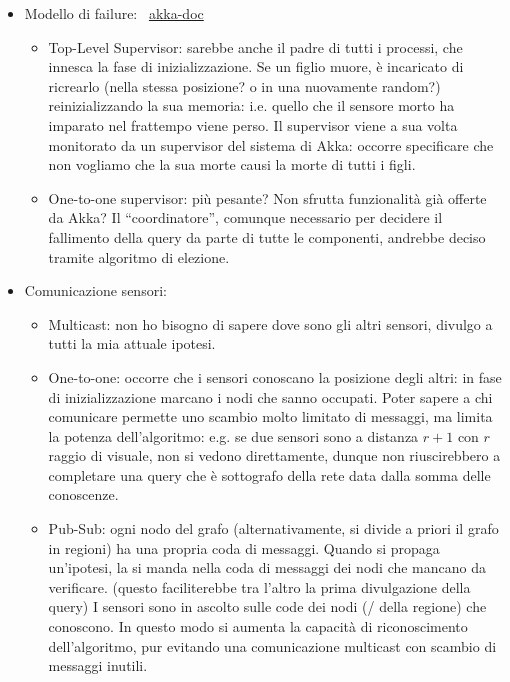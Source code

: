 \documentclass{article}
\begin{document}
\begin{itemize}
\begin{itemize}
  \end{itemize}
\item Modello di failure:%
  ~\href{https://doc.akka.io/docs/akka/2.5/fault-tolerance.html}{akka-doc}
  \begin{itemize}
  \item Top-Level Supervisor: sarebbe anche il padre di tutti
    i processi, che innesca la fase di inizializzazione. Se un figlio
    muore, \`e incaricato di ricrearlo (nella stessa posizione? o in una
    nuovamente random?) reinizializzando la sua memoria: i.e. quello che
    il sensore morto ha imparato nel frattempo viene perso.
    Il supervisor viene a sua volta monitorato da un supervisor del
    sistema di Akka: occorre specificare che non vogliamo che la sua
    morte causi la morte di tutti i figli.

  \item One-to-one supervisor: pi\`u pesante? Non sfrutta funzionalit\`a
    gi\`a offerte da Akka? Il ``coordinatore'', comunque necessario per
    decidere il fallimento della query da parte di tutte le componenti,
    andrebbe deciso tramite algoritmo di elezione.
  \end{itemize}
\item Comunicazione sensori:
  \begin{itemize}
  \item Multicast: non ho bisogno di sapere dove sono gli altri sensori,
    divulgo a tutti la mia attuale ipotesi.
  \item One-to-one: occorre che i sensori conoscano la posizione
    degli altri: in fase di inizializzazione marcano i nodi che sanno
    occupati. 
    Poter sapere a chi comunicare permette uno scambio molto limitato di
    messaggi, ma limita la potenza dell'algoritmo: e.g. se due sensori
    sono a distanza $r+1$ con $r$ raggio di visuale, non si vedono
    direttamente, dunque non riuscirebbero a completare una query che
    \`e sottografo della rete data dalla somma delle conoscenze.
  \item Pub-Sub: ogni nodo del grafo (alternativamente, si divide a priori
    il grafo in regioni) ha una propria coda di messaggi.
    Quando si propaga un'ipotesi, la si manda nella coda di messaggi dei
    nodi che mancano da verificare.
    (questo faciliterebbe tra l'altro la prima divulgazione della query)
    I sensori sono in ascolto sulle code dei nodi (/ della regione)
    che conoscono.
    In questo modo si aumenta la capacit\`a di riconoscimento
    dell'algoritmo, pur evitando una comunicazione multicast con
    scambio di messaggi inutili.


\end{itemize}
\end{itemize}
\end{document}
